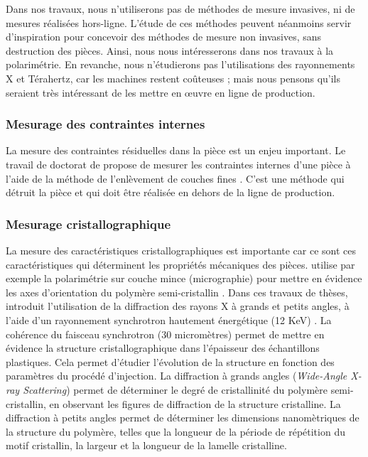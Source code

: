 Dans nos travaux, nous n'utiliserons pas de méthodes de mesure invasives, ni de mesures réalisées hors-ligne.
L'étude de ces méthodes peuvent néanmoins servir d'inspiration pour concevoir des méthodes de mesure non invasives, sans destruction des pièces.
Ainsi, nous nous intéresserons dans nos travaux à la polarimétrie.
En revanche, nous n'étudierons pas l'utilisations des rayonnements X et Térahertz, car les machines restent coûteuses ; mais nous pensons qu'ils seraient très intéressant de les mettre en œuvre en ligne de production.

\subsubsection{Mesurage des contraintes internes}
La mesure des contraintes résiduelles dans la pièce est un enjeu important.
Le travail de doctorat de \citeauthor{giroud_mesure_2001} propose de mesurer les contraintes internes d'une pièce à l'aide de la méthode de l'enlèvement de couches fines \cite{giroud_mesure_2001}.
C'est une méthode qui détruit la pièce et qui doit être réalisée en dehors de la ligne de production.

\subsubsection{Mesurage cristallographique}
La mesure des caractéristiques cristallographiques est importante car ce sont ces caractéristiques qui déterminent les propriétés mécaniques des pièces.
\citeauthor{mendoza_spatial_2003} utilise par exemple la polarimétrie sur couche mince (micrographie) pour mettre en évidence les axes d'orientation du polymère semi-cristallin \cite{mendoza_spatial_2003}.
Dans ces travaux de thèses, \citeauthor{malhab_moulage_2012} introduit l'utilisation de la diffraction des rayons X à grands et petits angles, à l'aide d'un rayonnement synchrotron hautement énergétique (12 KeV) \cite{malhab_moulage_2012}.
La cohérence du faisceau synchrotron (30 micromètres) permet de mettre en évidence la structure cristallographique dans l'épaisseur des échantillons plastiques.
Cela permet d'étudier l'évolution de la structure en fonction des paramètres du procédé d'injection.
La diffraction à grands angles (\textit{Wide-Angle X-ray Scattering}) permet de déterminer le degré de cristallinité du polymère semi-cristallin, en observant les figures de diffraction de la structure cristalline.  %
La diffraction à petits angles permet de déterminer les dimensions nanomètriques de la structure du polymère, telles que la longueur de la période de répétition du motif cristallin, la largeur et la longueur de la lamelle cristalline.

